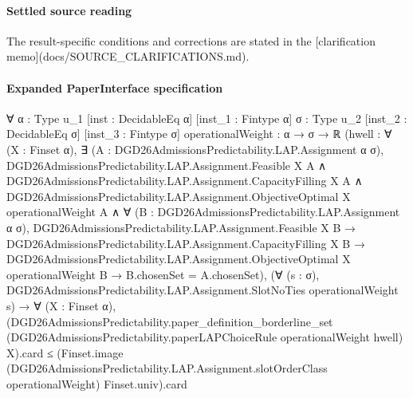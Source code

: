 \documentclass[10pt]{article}
\begin{document}

\paragraph{Settled source reading}
The result-\allowbreak{}specific conditions and corrections are stated in the [clarification memo](docs/\allowbreak{}SOURCE\_\allowbreak{}CLARIFICATIONS.\allowbreak{}md).\allowbreak{}

\paragraph{Expanded PaperInterface specification}
\begin{ReviewVerbatim}
∀ {α : Type u_1} [inst : DecidableEq α] [inst_1 : Fintype α] {σ : Type u_2} [inst_2 : DecidableEq σ]
  [inst_3 : Fintype σ] {operationalWeight : α → σ → ℝ}
  (hwell :
    ∀ (X : Finset α),
      ∃ (A : DGD26AdmissionsPredictability.LAP.Assignment α σ),
        DGD26AdmissionsPredictability.LAP.Assignment.Feasible X A ∧
          DGD26AdmissionsPredictability.LAP.Assignment.CapacityFilling X A ∧
            DGD26AdmissionsPredictability.LAP.Assignment.ObjectiveOptimal X operationalWeight A ∧
              ∀ (B : DGD26AdmissionsPredictability.LAP.Assignment α σ),
                DGD26AdmissionsPredictability.LAP.Assignment.Feasible X B →
                  DGD26AdmissionsPredictability.LAP.Assignment.CapacityFilling X B →
                    DGD26AdmissionsPredictability.LAP.Assignment.ObjectiveOptimal X operationalWeight B →
                      B.chosenSet = A.chosenSet),
  (∀ (s : σ), DGD26AdmissionsPredictability.LAP.Assignment.SlotNoTies operationalWeight s) →
    ∀ (X : Finset α),
      (DGD26AdmissionsPredictability.paper_definition_borderline_set
            (DGD26AdmissionsPredictability.paperLAPChoiceRule operationalWeight hwell) X).card ≤
        (Finset.image (DGD26AdmissionsPredictability.LAP.Assignment.slotOrderClass operationalWeight) Finset.univ).card
\end{ReviewVerbatim}
\end{document}
